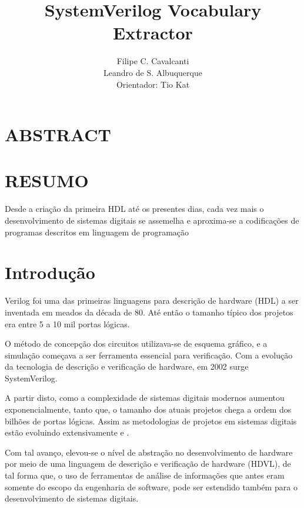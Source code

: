 \documentclass[12pt, twocolumn, a4paper]{article}
\begin{document}
	\title{SystemVerilog Vocabulary Extractor}
	\author{Filipe C. Cavalcanti\\ Leandro de S. Albuquerque\\
	Orientador: Tio Kat}
	\maketitle
	
	\section{ABSTRACT}
	
	\section{RESUMO}
	\quad Desde a criação da primeira HDL até os presentes dias, cada vez mais o desenvolvimento de sistemas digitais se assemelha e aproxima-se a codificações de programas descritos em linguagem de programação  
	
	\section{Introdução}

\quad Verilog foi uma das primeiras linguagens para descrição de hardware (HDL) a ser inventada em meados da década de 80. Até então o tamanho típico dos projetos era entre 5 a 10 mil portas lógicas. 

O método de concepção dos circuitos utilizava-se de esquema gráfico, e a simulação começava a ser  ferramenta essencial para verificação\cite{sutherland2006}. Com a evolução da tecnologia de descrição e verificação de hardware, em 2002 surge SystemVerilog. 

A partir disto, como a complexidade de sistemas digitais modernos aumentou exponencialmente, tanto que, o tamanho dos atuais projetos chega a ordem dos bilhões de portas lógicas. Assim as metodologias de projetos em sistemas digitais estão evoluindo extensivamente \cite{Marc-Andre} e \cite{Hahanov2008}.

Com tal avanço, elevou-se o nível de abstração no desenvolvimento de hardware por meio de uma linguagem de descrição e verificação de hardware (HDVL), de tal forma que, o uso de ferramentas de análise de informações que antes eram somente do escopo da engenharia de software, pode ser estendido também para o desenvolvimento de sistemas digitais.
\end{document}
